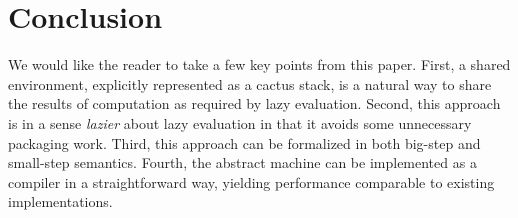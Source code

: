 \section{Conclusion} \label{sec:conc}

We would like the reader to take a few key points from this paper. First, a
shared environment, explicitly represented as a cactus stack, is a natural
way to share the results of computation as required by lazy evaluation. Second,
this approach is in a sense \emph{lazier} about lazy evaluation in that it
avoids some unnecessary packaging work. Third, this approach can be formalized
in both big-step and small-step semantics. Fourth, the abstract machine can be
implemented as a compiler in a straightforward way, yielding performance
comparable to existing implementations. 
